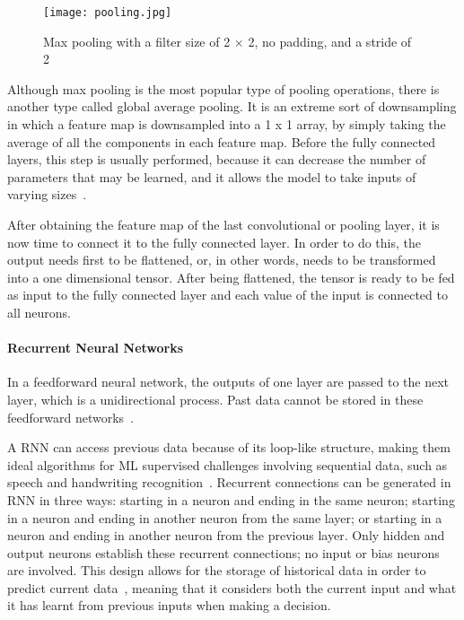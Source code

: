 \begin{figure}[htbp]
    \centering
    \texttt{[image: pooling.jpg]}
    \caption{Max pooling with a filter size of 2 × 2, no padding, and a stride of 2~\cite{Yamashita2018ConvolutionalRadiology}}
    \label{fig:pooling}
\end{figure}

Although max pooling is the most popular type of pooling operations, there is another type called global average pooling. It is an extreme sort of downsampling in which a feature map is downsampled into a 1 x 1 array, by simply taking the average of all the components in each feature map. Before the fully connected layers, this step is usually performed, because it can decrease the number of parameters that may be learned, and it allows the model to take inputs of varying sizes~\cite{Yamashita2018ConvolutionalRadiology}.

After obtaining the feature map of the last convolutional or pooling layer, it is now time to connect it to the fully connected layer. In order to do this, the output needs first to be flattened, or, in other words, needs to be transformed into a one dimensional tensor. After being flattened, the tensor is ready to be fed as input to the fully connected layer and each value of the input is connected to all neurons. 

\paragraph{Recurrent Neural Networks}

In a feedforward neural network, the outputs of one layer are passed to the next layer, which is a unidirectional process. Past data cannot be stored in these feedforward networks~\cite{Shewalkar2019PerformanceGRU}. 

A \gls{RNN} can access previous data because of its loop-like structure, making them ideal algorithms for \gls{ML} supervised challenges involving sequential data, such as speech and handwriting recognition~\cite{Ganatra2018ATools}. Recurrent connections can be generated in \gls{RNN} in three ways: starting in a neuron and ending in the same neuron; starting in a neuron and ending in another neuron from the same layer; or starting in a neuron and ending in another neuron from the previous layer. Only hidden and output neurons establish these recurrent connections; no input or bias neurons are involved. This design allows for the storage of historical data in order to predict current data~\cite{ShewalkarComparisonData}, meaning that it considers both the current input and what it has learnt from previous inputs when making a decision.

